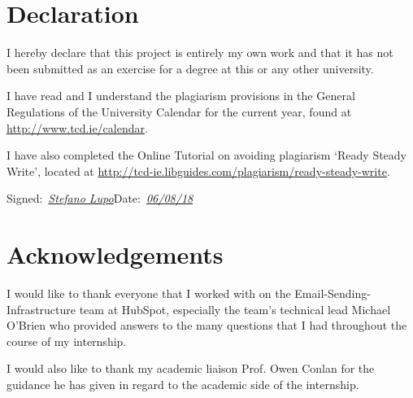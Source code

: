 \section*{\Huge{Declaration}}
\vspace{1cm}
I hereby declare that this project is entirely my own work and that it has not been submitted as an exercise for a degree at this or any other university.

\vspace{1cm}
I have read and I understand the plagiarism provisions in the General Regulations of the University Calendar for the current year, found at \url{http://www.tcd.ie/calendar}.
\vspace{1cm}

I have also completed the Online Tutorial on avoiding plagiarism `Ready Steady Write', located at
\url{http://tcd-ie.libguides.com/plagiarism/ready-steady-write}.
\vspace{3cm}

Signed:~\underline{\emph{Stefano Lupo}}\hfill Date:~\underline{\emph{06/08/18}}

\newpage
\onehalfspacing
\raggedright %

\section*{\Huge{Acknowledgements}}
I would like to thank everyone that I worked with on the Email-Sending-Infrastructure team at HubSpot, especially the team's technical lead Michael O'Brien who provided answers to the many questions that I had throughout the course of my internship.


I would also like to thank my academic liaison Prof. Owen Conlan for the guidance he has given in regard to the academic side of the internship.

\tableofcontents
\listoffigures
\listoftables
\lstlistoflistings
\newpage


